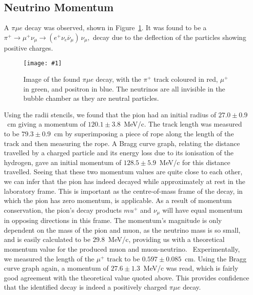 \documentclass[twocolumn]{article}
\newcommand{\insertFigure}[1]{%
   \texttt{[image: \#1]}%
}
\begin{document}
\subsection{Neutrino Momentum}
A $\pi \mu e$ decay was observed, shown in Figure~\ref{fig:neutrino}. It was found to be a $\pi^+ \to \mu^+ \nu_\mu \to (e^+ \nu_e \overline{\nu}_{\mu}) \, \nu_\mu,$ decay due to the deflection of the particles showing positive charges.
\begin{figure}[!h]
	\centering
	\insertFigure{neutrino.png}
	\caption{Image of the found $\pi \mu e$ decay, with the $\pi^+$ track coloured in red, $\mu^+$ in green, and positron in blue. The neutrinos are all invisible in the bubble chamber as they are neutral particles.}
	\label{fig:neutrino}
\end{figure}
Using the radii stencils, we found that the pion had an initial radius of $27.0 \pm 0.9$~cm giving a momentum of $120.1 \pm 3.8$~MeV/c. The track length was measured to be $79.3 \pm 0.9$~cm by superimposing a piece of rope along the length of the track and then measuring the rope. A Bragg curve graph, relating the distance travelled by a charged particle and its energy loss due to its ionisation of the hydrogen, gave an initial momentum of $128.5 \pm 5.9$~MeV/c for this distance travelled. Seeing that these two momentum values are quite close to each other, we can infer that the pion has indeed decayed while approximately at rest in the laboratory frame. This is important as the centre-of-mass frame of the decay, in which the pion has zero momentum, is applicable. As a result of momentum conservation, the pion's decay products $mu^+$ and $\nu_\mu$ will have equal momentum in opposing directions in this frame. The momentum's magnitude is only dependent on the mass of the pion and muon, as the neutrino mass is so small, and is easily calculated to be $29.8$~MeV/c, providing us with a theoretical momentum value for the produced muon and muon-neutrino.~\cite{seul} Experimentally, we measured the length of the $\mu^+$ track to be $0.597 \pm 0.085$~cm. Using the Bragg curve graph again, a momentum of $27.6 \pm 1.3$~MeV/c was read, which is fairly good agreement with the theoretical value quoted above. This provides confidence that the identified decay is indeed a positively charged $\pi \mu e$ decay.
\end{document}
